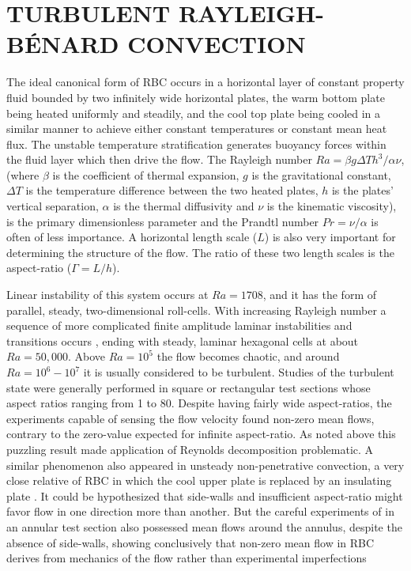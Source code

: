 \documentclass[twocolumn,10pt]{tsfp}
\begin{document}
\section*{TURBULENT RAYLEIGH-B\'{E}NARD CONVECTION}
     The ideal canonical form of RBC occurs in a horizontal layer of constant property fluid bounded by two infinitely wide horizontal plates, the warm bottom plate being heated uniformly and steadily, and the cool top plate being cooled in a similar manner to achieve either constant temperatures or constant mean heat flux.   
%
The unstable temperature stratification generates buoyancy forces within the fluid layer which then drive the flow. The Rayleigh number $Ra=\beta g \Delta T h^3/\alpha \nu$, (where $\beta$ is the coefficient of thermal expansion, $g$ is the gravitational constant, $\Delta T$ is the temperature difference between the two heated plates, $h$ is the plates' vertical separation, $\alpha$ is the thermal diffusivity and $\nu$ is the kinematic viscosity), is the primary dimensionless parameter and the Prandtl number $Pr=\nu/\alpha$ is often of less importance. A horizontal length scale ($L$) is also very important for determining the structure of the flow. The ratio of these two length scales is the aspect-ratio ($\Gamma=L/h$).

    Linear instability of this system occurs at $Ra=1708$, and it has the form of parallel, steady, two-dimensional roll-cells. With increasing Rayleigh number a sequence of more complicated finite amplitude laminar instabilities and transitions occurs \citep{busse1971instabilities,busse1974oscillatory,busse1978non}, ending with steady, laminar hexagonal cells at about $Ra=50,000$. Above $Ra= 10^5$ the flow becomes chaotic, and around $Ra=10^6-10^7$ it is usually considered to be turbulent. Studies of the turbulent state \citep{chu1973turbulent,garon1973velocity,willis1970oscillatory,fitzjarrald1976experimental} were generally performed in square or rectangular test sections whose aspect ratios ranging from 1 to 80. Despite having fairly wide aspect-ratios, the experiments capable of sensing the flow velocity found non-zero mean flows, contrary to the zero-value expected for infinite aspect-ratio. As noted above this puzzling result made application of Reynolds decomposition problematic. A similar phenomenon also appeared in unsteady non-penetrative convection, a very close relative of RBC in which the cool upper plate is replaced by an insulating plate \citep{adrian1986turbulent}. It could be hypothesized that side-walls and insufficient aspect-ratio  might favor flow in one direction more than another. But the careful experiments of \cite{krishnamurti1981large} in an annular test section also possessed mean flows around the annulus, despite the absence of side-walls, showing conclusively that non-zero mean flow in RBC derives from mechanics of the flow rather than experimental imperfections
\end{document}
